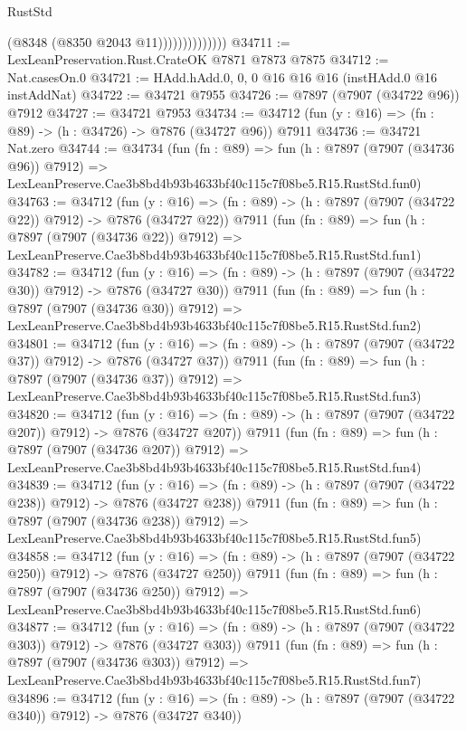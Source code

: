 \begin{lexlean}{RustStd}
\begin{coremodule}
                            (@8348 (@8350 @2043 @11))))))))))))))
@34711 := LexLeanPreservation.Rust.CrateOK @7871 @7873 @7875
@34712 := Nat.casesOn.{0}
@34721 := HAdd.hAdd.{0, 0, 0} @16 @16 @16 (instHAdd.{0} @16 instAddNat)
@34722 := @34721 @7955
@34726 := @7897 (@7907 (@34722 @96)) @7912
@34727 := @34721 @7953
@34734 := @34712 (fun (y : @16) => (fn : @89) -> (h : @34726) -> @7876 (@34727 @96)) @7911
@34736 := @34721 Nat.zero
@34744 := @34734
    (fun (fn : @89) =>
    fun (h : @7897 (@7907 (@34736 @96)) @7912) =>
    LexLeanPreserve.Cae3b8bd4b93b4633bf40c115c7f08be5.R15.RustStd.fun0)
@34763 := @34712
    (fun (y : @16) => (fn : @89) -> (h : @7897 (@7907 (@34722 @22)) @7912) -> @7876 (@34727 @22))
    @7911
    (fun (fn : @89) =>
    fun (h : @7897 (@7907 (@34736 @22)) @7912) =>
    LexLeanPreserve.Cae3b8bd4b93b4633bf40c115c7f08be5.R15.RustStd.fun1)
@34782 := @34712
    (fun (y : @16) => (fn : @89) -> (h : @7897 (@7907 (@34722 @30)) @7912) -> @7876 (@34727 @30))
    @7911
    (fun (fn : @89) =>
    fun (h : @7897 (@7907 (@34736 @30)) @7912) =>
    LexLeanPreserve.Cae3b8bd4b93b4633bf40c115c7f08be5.R15.RustStd.fun2)
@34801 := @34712
    (fun (y : @16) => (fn : @89) -> (h : @7897 (@7907 (@34722 @37)) @7912) -> @7876 (@34727 @37))
    @7911
    (fun (fn : @89) =>
    fun (h : @7897 (@7907 (@34736 @37)) @7912) =>
    LexLeanPreserve.Cae3b8bd4b93b4633bf40c115c7f08be5.R15.RustStd.fun3)
@34820 := @34712
    (fun (y : @16) => (fn : @89) -> (h : @7897 (@7907 (@34722 @207)) @7912) -> @7876 (@34727 @207))
    @7911
    (fun (fn : @89) =>
    fun (h : @7897 (@7907 (@34736 @207)) @7912) =>
    LexLeanPreserve.Cae3b8bd4b93b4633bf40c115c7f08be5.R15.RustStd.fun4)
@34839 := @34712
    (fun (y : @16) => (fn : @89) -> (h : @7897 (@7907 (@34722 @238)) @7912) -> @7876 (@34727 @238))
    @7911
    (fun (fn : @89) =>
    fun (h : @7897 (@7907 (@34736 @238)) @7912) =>
    LexLeanPreserve.Cae3b8bd4b93b4633bf40c115c7f08be5.R15.RustStd.fun5)
@34858 := @34712
    (fun (y : @16) => (fn : @89) -> (h : @7897 (@7907 (@34722 @250)) @7912) -> @7876 (@34727 @250))
    @7911
    (fun (fn : @89) =>
    fun (h : @7897 (@7907 (@34736 @250)) @7912) =>
    LexLeanPreserve.Cae3b8bd4b93b4633bf40c115c7f08be5.R15.RustStd.fun6)
@34877 := @34712
    (fun (y : @16) => (fn : @89) -> (h : @7897 (@7907 (@34722 @303)) @7912) -> @7876 (@34727 @303))
    @7911
    (fun (fn : @89) =>
    fun (h : @7897 (@7907 (@34736 @303)) @7912) =>
    LexLeanPreserve.Cae3b8bd4b93b4633bf40c115c7f08be5.R15.RustStd.fun7)
@34896 := @34712
    (fun (y : @16) => (fn : @89) -> (h : @7897 (@7907 (@34722 @340)) @7912) -> @7876 (@34727 @340))

\end{coremodule}
\end{lexlean}
